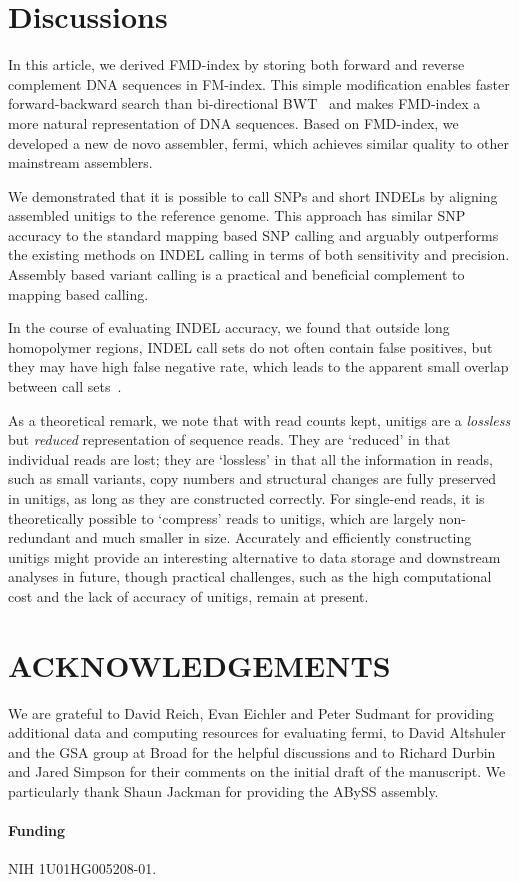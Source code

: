 \documentclass{bioinfo}
\begin{document}
\vspace*{-1em}

\section{Discussions}
In this article, we derived FMD-index by storing both forward and reverse
complement DNA sequences in FM-index. This simple modification enables faster
forward-backward search than bi-directional BWT~\citep{Lam:2009fk} and makes
FMD-index a more natural representation of DNA sequences. Based on FMD-index,
we developed a new de novo assembler, fermi, which achieves similar quality
to other mainstream assemblers.

We demonstrated that it is possible to call SNPs and short INDELs by aligning
assembled unitigs to the reference genome. This approach has similar SNP
accuracy to the standard mapping based SNP calling and arguably outperforms
the existing methods on INDEL calling in terms of both sensitivity and
precision. Assembly based variant calling is a practical and beneficial
complement to mapping based calling.

In the course of evaluating INDEL accuracy, we found that outside long
homopolymer regions, INDEL call sets do not often contain false positives, but
they may have high false negative rate, which leads to the apparent small
overlap between call sets~\citep{Lam:2012fk}.

As a theoretical remark, we note that with read counts kept, unitigs are a
\emph{lossless} but \emph{reduced} representation of sequence reads. They are
`reduced' in that individual reads are lost; they are `lossless' in that all
the information in reads, such as small variants, copy numbers and structural
changes are fully preserved in unitigs, as long as they are constructed
correctly. For single-end reads, it is theoretically possible to `compress'
reads to unitigs, which are largely non-redundant and much smaller in size.
Accurately and efficiently constructing unitigs might provide an interesting
alternative to data storage and downstream analyses in future, though practical
challenges, such as the high computational cost and the lack of accuracy of
unitigs, remain at present.

\vspace*{-1em}

\section*{ACKNOWLEDGEMENTS}
We are grateful to David Reich, Evan Eichler and Peter Sudmant for providing
additional data and computing resources for evaluating fermi, to David
Altshuler and the GSA group at Broad for the helpful discussions and to Richard
Durbin and Jared Simpson for their comments on the initial draft of the
manuscript. We particularly thank Shaun Jackman for providing the ABySS
assembly.

\paragraph{Funding\textcolon} NIH 1U01HG005208-01.

\end{document}
